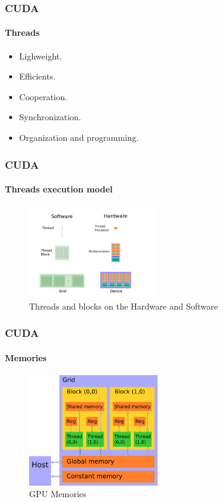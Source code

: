 \begin{frame}
    \frametitle{CUDA}
    \framesubtitle{Threads}
    \begin{itemize}
        \item Lighweight.
        \item Efficients.
        \item Cooperation.
        \item Synchronization.
        \item Organization and programming.
    \end{itemize}
\end{frame}

\begin{frame}
    \frametitle{CUDA}
    \framesubtitle{Threads execution model}
    \begin{figure}
        \centering
        \label{fig:cuda-threads}
        \includegraphics[width=0.5\textwidth]{img/cuda-threads}
        \caption{Threads and blocks on the Hardware and Software}
    \end{figure}
\end{frame}

\begin{frame}
    \frametitle{CUDA}
    \framesubtitle{Memories}
    \begin{figure}
        \centering
        \label{fig:cuda-memories}
        \includegraphics[width=0.5\textwidth]{img/cuda-memories}
        \caption{GPU Memories}
    \end{figure}
\end{frame}

